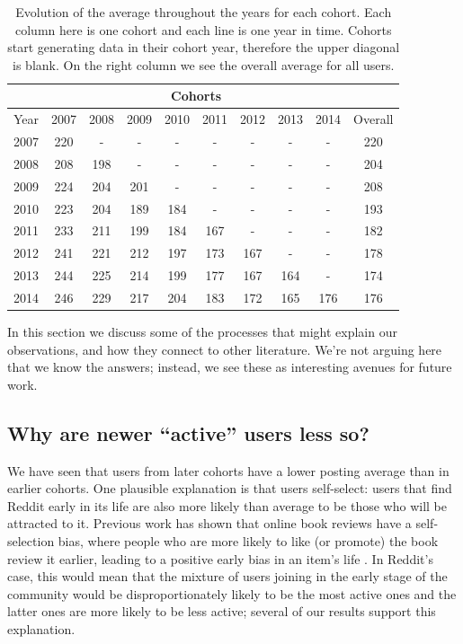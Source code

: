 \begin{table}[!tbh]
\centering
\tabcolsep=0.07cm
\singlespacing
\fontsize{9pt}{10.5pt}\selectfont
\begin{tabular}{|c|c|c|c|c|c|c|c|c|c|}
\cline{2-9}
\multicolumn{1}{c|}{} & \multicolumn{8}{c|}{Cohorts} \\ \hline
Year & 2007 & 2008 & 2009 & 2010 & 2011 & 2012 & 2013 & 2014 & Overall\\ \hline
2007 & 220 & - & - & - & - & - & - & - & 220 \\ \hline
2008 & 208 & 198 & - & - & - & - & - & - & 204 \\ \hline
2009 & 224 & 204 & 201 & - & - & - & - & - & 208 \\ \hline
2010 & 223 & 204 & 189 & 184 & - & - & - & - & 193 \\ \hline
2011 & 233 & 211 & 199 & 184 & 167 & - & - & - & 182 \\ \hline
2012 & 241 & 221 & 212 & 197 & 173 & 167 & - & - & 178 \\ \hline
2013 & 244 & 225 & 214 & 199 & 177 & 167 & 164 & - & 174 \\ \hline
2014 & 246 & 229 & 217 & 204 & 183 & 172 & 165 & 176 & 176 \\ \hline
\end{tabular}
\caption{Evolution of the average throughout the years for each cohort. Each column here is one cohort and each line is one year in time. Cohorts start generating data in their cohort year, therefore the upper diagonal is blank. On the right column we see the overall average for all users.}
\label{tab:rqtablereddit}
\end{table}

In this section we discuss some of the processes that might explain our observations, and how they connect to other literature.  We're not arguing here that we know the answers; instead, we see these as interesting avenues for future work.

\subsection{Why are newer ``active'' users less so?}

We have seen that users from later cohorts have a lower posting average than in earlier cohorts. 
One plausible explanation is that users self-select: users that find Reddit early in its life are also more likely than average to be those who will be attracted to it. Previous work has shown that online book reviews have a self-selection bias, where people who are more likely to like (or promote) the book review it earlier, leading to a positive early bias in an item's life \cite{Li2008}.  In Reddit's case, this would mean that the mixture of users joining in the early stage of the community would be disproportionately likely to be the most active ones and the latter ones are more likely to be less active; several of our results support this explanation.

